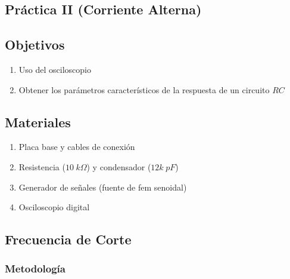 \documentclass[11pt]{report}
\begin{document}
\begin{refsection}
\chapter{Práctica II (Corriente Alterna)}

\section{\textbf{Objetivos}}
\begin{enumerate}
    \item Uso del osciloscopio
    \item Obtener los parámetros característicos de la respuesta de un circuito $RC$
\end{enumerate}

\section{\textbf{Materiales}}
\begin{enumerate}
    \item Placa base y cables de conexión
    \item Resistencia ($10 \hspace{3pt} k\Omega$) y condensador ($12k\hspace{3pt} pF$)
    \item Generador de señales (fuente de fem senoidal)
    \item Osciloscopio digital
\end{enumerate}

\section{\textbf{Frecuencia de Corte}}
\subsection{Metodología}


\end{refsection}
\end{document}
